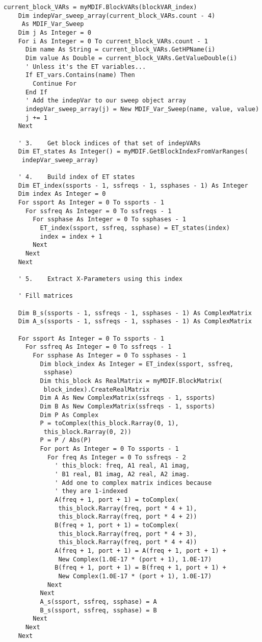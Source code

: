 \documentclass[../thesis/thesis.tex]{subfiles}
\begin{document}
\begin{lstlisting}[language=vbscript]
    current_block_VARs = myMDIF.BlockVARs(blockVAR_index)
    Dim indepVar_sweep_array(current_block_VARs.count - 4) 
     As MDIF_Var_Sweep
    Dim j As Integer = 0
    For i As Integer = 0 To current_block_VARs.count - 1
      Dim name As String = current_block_VARs.GetHPName(i)
      Dim value As Double = current_block_VARs.GetValueDouble(i)
      ' Unless it's the ET variables...
      If ET_vars.Contains(name) Then
        Continue For
      End If
      ' Add the indepVar to our sweep object array
      indepVar_sweep_array(j) = New MDIF_Var_Sweep(name, value, value)
      j += 1
    Next
    
    ' 3.    Get block indices of that set of indepVARs
    Dim ET_states As Integer() = myMDIF.GetBlockIndexFromVarRanges(
     indepVar_sweep_array)
    
    ' 4.    Build index of ET states
    Dim ET_index(ssports - 1, ssfreqs - 1, ssphases - 1) As Integer
    Dim index As Integer = 0
    For ssport As Integer = 0 To ssports - 1
      For ssfreq As Integer = 0 To ssfreqs - 1
        For ssphase As Integer = 0 To ssphases - 1
          ET_index(ssport, ssfreq, ssphase) = ET_states(index)
          index = index + 1
        Next
      Next
    Next
    
    ' 5.    Extract X-Parameters using this index
    
    ' Fill matrices
    
    Dim B_s(ssports - 1, ssfreqs - 1, ssphases - 1) As ComplexMatrix
    Dim A_s(ssports - 1, ssfreqs - 1, ssphases - 1) As ComplexMatrix
    
    For ssport As Integer = 0 To ssports - 1
      For ssfreq As Integer = 0 To ssfreqs - 1
        For ssphase As Integer = 0 To ssphases - 1
          Dim block_index As Integer = ET_index(ssport, ssfreq, 
           ssphase)
          Dim this_block As RealMatrix = myMDIF.BlockMatrix(
           block_index).CreateRealMatrix
          Dim A As New ComplexMatrix(ssfreqs - 1, ssports)
          Dim B As New ComplexMatrix(ssfreqs - 1, ssports)
          Dim P As Complex
          P = toComplex(this_block.Rarray(0, 1), 
           this_block.Rarray(0, 2))
          P = P / Abs(P)
          For port As Integer = 0 To ssports - 1
            For freq As Integer = 0 To ssfreqs - 2
              ' this_block: freq, A1 real, A1 imag, 
              ' B1 real, B1 imag, A2 real, A2 imag. 
              ' Add one to complex matrix indices because 
              ' they are 1-indexed
              A(freq + 1, port + 1) = toComplex(
               this_block.Rarray(freq, port * 4 + 1), 
               this_block.Rarray(freq, port * 4 + 2))
              B(freq + 1, port + 1) = toComplex(
               this_block.Rarray(freq, port * 4 + 3), 
               this_block.Rarray(freq, port * 4 + 4))
              A(freq + 1, port + 1) = A(freq + 1, port + 1) +
               New Complex(1.0E-17 * (port + 1), 1.0E-17)
              B(freq + 1, port + 1) = B(freq + 1, port + 1) + 
               New Complex(1.0E-17 * (port + 1), 1.0E-17)
            Next
          Next
          A_s(ssport, ssfreq, ssphase) = A
          B_s(ssport, ssfreq, ssphase) = B
        Next
      Next
    Next
    

\end{lstlisting}
\end{document}
